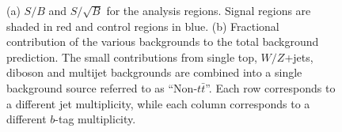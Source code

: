 \begin{figure}[t!]
\captionsetup{width=0.85\textwidth}  \caption{\small (a) $S/B$ and $S/\sqrt{B}$ for the analysis regions. Signal regions are shaded in red and control regions in blue. (b) Fractional contribution of the various backgrounds to the total background prediction. The small contributions from single top, $W/Z$+jets, diboson and multijet backgrounds are combined into a single background source referred to as ``Non-$t\bar{t}$''. Each row corresponds to a different jet multiplicity, while each column corresponds to a different $b$-tag multiplicity.}
\label{sec:tth:fig:soverbpie}
\end{figure}